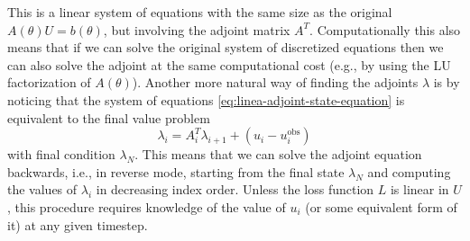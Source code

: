This is a linear system of equations with the same size as the original $A(\theta) U = b(\theta)$, but involving the adjoint matrix $A^T$. 
Computationally this also means that if we can solve the original system of discretized equations then we can also solve the adjoint at the same computational cost (e.g., by using the LU factorization of $A(\theta)$). 
Another more natural way of finding the adjoints $\lambda$ is by noticing that the system of equations \eqref{eq:linea-adjoint-state-equation} is equivalent to the final value problem 
\begin{equation}
    \lambda_{i} = A_{i}^T \lambda_{i+1} + (u_i - u_i^\text{obs})
    \label{eq:adjoint-discrete-linear-example}
\end{equation}
with final condition $\lambda_N$. 
This means that we can solve the adjoint equation backwards, i.e., in reverse mode, starting from the final state $\lambda_N$ and computing the values of $\lambda_i$ in decreasing index order. 
Unless the loss function $L$ is linear in $U$, this procedure requires knowledge of the value of $u_i$ (or some equivalent form of it) at any given timestep. 